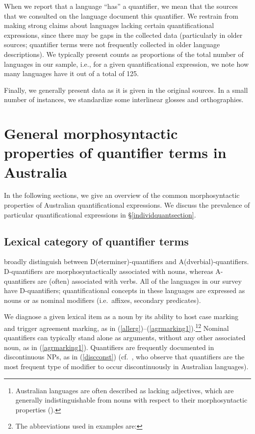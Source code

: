 \documentclass[12pt,egregdoesnotlikesansseriftitles]{scrartcl}
\begin{document}
When we report that a language ``has'' a quantifier, we mean that the sources that we consulted on the language document this quantifier. We restrain from making strong claims about languages lacking certain quantificational
expressions, since there may be gaps in the collected data (particularly in older sources; quantifier terms were not frequently collected in older language descriptions). We typically present counts as proportions of the total number of languages in our sample, i.e., for a given quantificational expression, we note how many languages have it out of a total of 125.

Finally, we generally present data as it is given in the original sources. In a small number of  instances, we standardize some interlinear glosses and orthographies.


\section{General morphosyntactic properties of  quantifier terms in Australia}

In the following sections, we give an overview of the common morphosyntactic properties of Australian quantificational expressions. We discuss the prevalence of particular quantificational expressions in \S\ref{individquantsection}.

\subsection{Lexical category of quantifier terms}

\cite{bachetal95} broadly distinguish between D(eterminer)-quantifiers and A(dverbial)-quantifiers. D-quantifiers are morphosyntactically associated with nouns, whereas A-quantifiers are (often) associated with verbs. All of the languages in our survey have D-quantifiers; quantificational concepts in these languages are expressed as nouns or as nominal modifiers (i.e.\ affixes, secondary predicates). 

We diagnose a given lexical item as a noun by its ability to host case marking and trigger agreement marking, as in (\ref{allerg})--(\ref{agrmarking1}).\footnote{Australian languages are often described as lacking adjectives, which are generally indistinguishable from nouns with respect to their morphosyntactic properties (\citealt[67-68]{dixon02}).}\footnote{The abbreviations used in examples are: \printglossary[style=inline,type=\leipzigtype]} Nominal quantifiers can typically stand alone as arguments, without any other associated noun, as in (\ref{agrmarking1}). Quantifiers are frequently documented in discontinuous NPs, as in (\ref{discconst}) (cf.\ \citealt[51-52]{louagieverstraete16}, who observe that quantifiers are the most frequent type of modifier to occur discontinuously in Australian languages). 
\end{document}
